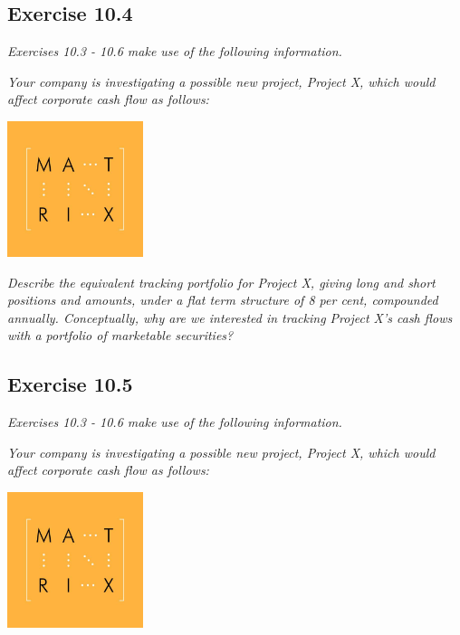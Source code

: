 \documentclass[]{book}
\theoremstyle{definition}
\theoremstyle{definition}
\theoremstyle{remark}
\begin{document}
\subsection{Exercise 10.4}\label{exercise-10.4}

\emph{Exercises 10.3 - 10.6 make use of the following information.}
\citep[p.338]{book}

\emph{Your company is investigating a possible new project, Project X,
which would affect corporate cash flow as follows:} \citep[p.338]{book}

\begin{center}\includegraphics[width=150px]{figures/matrix} \end{center}

\emph{Describe the equivalent tracking portfolio for Project X, giving
long and short positions and amounts, under a flat term structure of 8
per cent, compounded annually. Conceptually, why are we interested in
tracking Project X's cash flows with a portfolio of marketable
securities?} \citep[p.339]{book}

\subsection{Exercise 10.5}\label{exercise-10.5}

\emph{Exercises 10.3 - 10.6 make use of the following information.}
\citep[p.338]{book}

\emph{Your company is investigating a possible new project, Project X,
which would affect corporate cash flow as follows:} \citep[p.338]{book}

\begin{center}\includegraphics[width=150px]{figures/matrix} \end{center}
\end{document}
